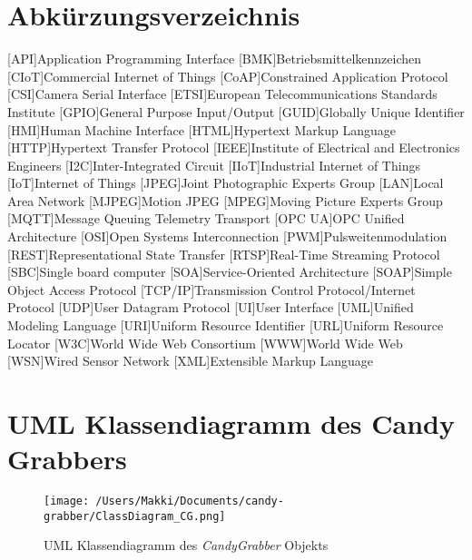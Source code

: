 \documentclass[BMR,Bachelor,ngerman]{twbook}%
\providecommand\listacroname{}
\renewcommand\listacroname{List of Abbreviations}
\renewcommand\listacroname{Abkürzungsverzeichnis}
\begin{document}
\chapter*{\listacroname}
\begin{acronym}[XXXXX]
	[API]{Application Programming Interface}
	[BMK]{Betriebsmittelkennzeichen}
	[CIoT]{Commercial Internet of Things}
	[CoAP]{Constrained Application Protocol}
	[CSI]{Camera Serial Interface}
	[ETSI]{European Telecommunications Standards Institute}
	[GPIO]{General Purpose Input/Output}
	[GUID]{Globally Unique Identifier}
	[HMI]{Human Machine Interface}
	[HTML]{Hypertext Markup Language}
	[HTTP]{Hypertext Transfer Protocol}
	[IEEE]{Institute of Electrical and Electronics Engineers}
	[I2C]{Inter-Integrated Circuit}
	[IIoT]{Industrial Internet of Things}
	[IoT]{Internet of Things}
	[JPEG]{Joint Photographic Experts Group}
	[LAN]{Local Area Network}
	[MJPEG]{Motion JPEG}
	[MPEG]{Moving Picture Experts Group}
   	[MQTT]{Message Queuing Telemetry Transport}
	[OPC UA]{OPC Unified Architecture}
   	[OSI]{Open Systems Interconnection}
	[PWM]{Pulsweitenmodulation}
	[REST]{Representational State Transfer}
	[RTSP]{Real-Time Streaming Protocol}
	[SBC]{Single board computer}
   	[SOA]{Service-Oriented Architecture}
	[SOAP]{Simple Object Access Protocol}
   	[TCP/IP]{Transmission Control Protocol/Internet Protocol}
	[UDP]{User Datagram Protocol}
	[UI]{User Interface}
	[UML]{Unified Modeling Language}
	[URI]{Uniform Resource Identifier}
	[URL]{Uniform Resource Locator}
	[W3C]{World Wide Web Consortium}
   	[WWW]{World Wide Web}
   	[WSN]{Wired Sensor Network}
	[XML]{Extensible Markup Language}
\end{acronym}

%
%
\appendix
\chapter{UML Klassendiagramm des Candy Grabbers}
\begin{figure}[H]
\centering
\texttt{[image: /Users/Makki/Documents/candy-grabber/ClassDiagram\_CG.png]}
\caption{UML Klassendiagramm des \emph{CandyGrabber} Objekts}\label{fig:uml_class}
\end{figure}
%
\end{document}
